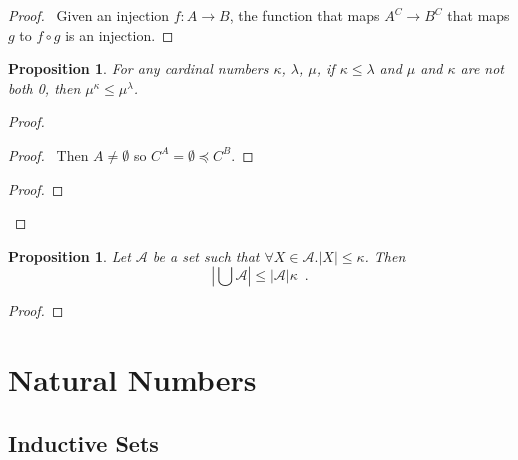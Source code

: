 \documentclass{book}
\let\qed\relax
\newtheorem{prop}[ax]{Proposition}
\theoremstyle{definition}
\begin{document}
\begin{proof}
\pf\ Given an injection $f : A \rightarrow B$, the function that maps $A^C \rightarrow B^C$ that maps $g$ to $f \circ g$ is an injection. \qed
\end{proof}

\begin{prop}
For any cardinal numbers $\kappa$, $\lambda$, $\mu$, if $\kappa \leq \lambda$ and $\mu$ and $\kappa$ are not both 0, then $\mu^\kappa \leq \mu^\lambda$.
\end{prop}

\begin{proof}
\pf
{}
\begin{proof}
	\pf\ Then $A \neq \emptyset$ so $C^A = \emptyset \preccurlyeq C^B$.
\end{proof}
\begin{proof}
\end{proof}
\qed
\end{proof}

\begin{prop}
\label{prop:unioncard}
Let $\mathcal{A}$ be a set such that $\forall X \in \mathcal{A}. |X| \leq \kappa$. Then
\[ \left| \bigcup \mathcal{A} \right| \leq |\mathcal{A}| \kappa \enspace . \]
\end{prop}

\begin{proof}
\pf
{}
\qed
\end{proof}

\chapter{Natural Numbers}

\section{Inductive Sets}
\end{document}
